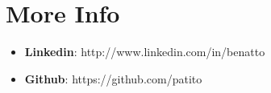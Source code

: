 \documentclass[margin]{res}
\begin{document}
\begin{resume}
\begin{itemize}
		\end{itemize}
 
\section{More Info}
    \begin{itemize}
        \item \textbf{Linkedin}: http://www.linkedin.com/in/benatto
         \item \textbf{Github}: https://github.com/patito
    \end{itemize}


\end{resume} 
\end{document}
